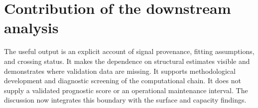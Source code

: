 \section{Contribution of the downstream analysis}
The useful output is an explicit account of signal provenance, fitting assumptions, and crossing status. It makes the dependence on structural estimates visible and demonstrates where validation data are missing. It supports methodological development and diagnostic screening of the computational chain. It does not supply a validated prognostic score or an operational maintenance interval. The discussion now integrates this boundary with the surface and capacity findings.
